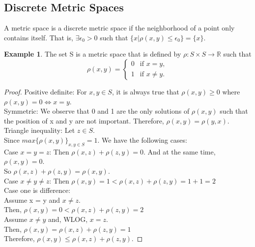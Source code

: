 \documentclass[12pt, reqno]{amsart}
\theoremstyle{definition}
\newtheorem{example}[theorem]{Example}
\numberwithin{equation}{section}
\newcommand{\dR}{{\mathbb R}}
\begin{document}
    \subsection{Discrete Metric Spaces}
    A metric space is a discrete metric space if the neighborhood of a point only contains itself. That is, $\exists \epsilon_0>0$ such that ${\{x|\rho(x,y) \leq \epsilon_0\} = \{x\}}$.
    \begin{example} \label{discrete me}
        The set S is a metric space that is defined by $\rho: S \times S \longrightarrow \dR$ such that\\
        \begin{equation}
        \rho(x,y)=
        \begin{cases}
            0 & \text{if } x = y,\\
            1 & \text{if } x \neq y.
        \end{cases}
    \end{equation}
    \begin{proof}
        Positive definite: For $x, y \in S$, it is always true that $\rho(x, y) \geq 0$ where $\rho(x,y)=0 \iff x=y$.\\
        Symmetric: We observe that 0 and 1 are the only solutions of $\rho(x, y)$ such that the position of x and y are not important. Therefore, ${\rho(x, y) = \rho(y, x)}$.\\
        Triangle inequality: Let $z \in S$.\\
       \hspace*{4cm} Since $max\{\rho(x,y)\}_{x,y \in S} = 1$. We have the following cases:\\
       \hspace*{2cm} Case $x=y=z$: Then $\rho(x, z) + \rho(z, y) =0$. And at the same time, $\rho(x,y) = 0$.\\
        \hspace*{4cm}So $\rho(x, z) + \rho(z, y) = \rho(x,y)$.\\
        \hspace*{2cm} Case $x \neq y \neq z$: Then $\rho(x, y) = 1 < \rho(x, z) + \rho(z, y) = 1 + 1 = 2$\\
        \hspace*{2cm} Case one is difference:\\
        \hspace*{4cm}Assume x = y and $x \neq z$. \\
        \hspace*{4cm} Then, ${ \rho(x, y) = 0 < \rho(x, z) + \rho(z, y) = 2}$\\
        \hspace*{4cm}Assume $x \neq y$ and, WLOG, $x = z$. \\
        \hspace*{4cm} Then, $ \rho(x, y) = \rho(x, z) + \rho(z, y) = 1$\\
        \hspace*{2cm}Therefore, $\rho(x,y) \leq \rho(x, z) + \rho(z, y)$.
        \end{proof}
    \end{example}
\end{document}
